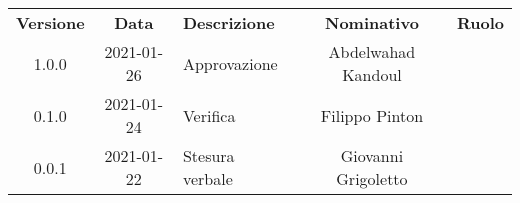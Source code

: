 {
    \renewcommand{\arraystretch}{1.5}
    \centering
    \begin{longtable}{ c c  C{4cm}  c  c }
        \rowcolor{\primaryColor}
        \textcolor{\secondaryColor}{
        \textbf{Versione}}     & \textcolor{\secondaryColor}{\textbf{Data}}       & \textcolor{\secondaryColor}
        {\textbf{Descrizione}} & \textcolor{\secondaryColor}{\textbf{Nominativo}} & \textcolor{\secondaryColor}{\textbf{Ruolo}}                          \\


        1.0.0                  & 2021-01-26                                       & Approvazione                                & Abdelwahad Kandoul & \responsabile{} \\
        0.1.0                  & 2021-01-24                                       & Verifica                                    & Filippo Pinton & \verificatore{} \\
        0.0.1                  & 2021-01-22                                       & Stesura verbale                           & Giovanni Grigoletto & \redattore{}    \\
    \end{longtable}
}